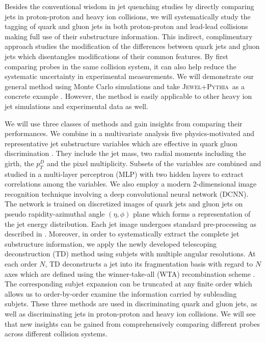 \documentclass[notoc]{JHEP3}
\newcommand{\jwpy}{\textsc{Jewel+Pythia}~}
\begin{document}
Besides the conventional wisdom in jet quenching studies by directly comparing jets in proton-proton and heavy ion collisions, we will systematically study the tagging of quark and gluon jets in both proton-proton and lead-lead collisions making full use of their substructure information. This indirect, complimentary approach studies the modification of the differences between quark jets and gluon jets which disentangles modifications of their common features. By first comparing probes in the same collision system, it can also help reduce the systematic uncertainty in experimental measurements. We will demonstrate our general method using Monte Carlo simulations and take \jwpy as a concrete example \cite{Zapp:2013zya,KunnawalkamElayavalli:2016ttl}. However, the method is easily applicable to other heavy ion jet simulations \cite{Armesto:2009fj,Cao:2017zih} and experimental data as well.

We will use three classes of methods and gain insights from comparing their performances. We combine in a multivariate analysis five physics-motivated and representative jet substructure variables which are effective in quark gluon discrimination \cite{Gallicchio:2012ez}. They include the jet mass, two radial moments including the girth, the $p_T^D$ and the pixel multiplicity. Subsets of the variables are combined and studied in a multi-layer perceptron (MLP) with two hidden layers to extract correlations among the variables. We also employ a modern 2-dimensional image recognition technique involving a deep convolutional neural network (DCNN). The network is trained on discretized images of quark jets and gluon jets on pseudo rapidity-azimuthal angle $(\eta,\phi)$ plane which forms a representation of the jet energy distribution. Each jet image undergoes standard pre-processing as described in \cite{deOliveira:2015xxd}. Moreover, in order to systematically extract the complete jet substructure information, we apply the newly developed telescoping deconstruction (TD) method using subjets with multiple angular resolutions. At each order $N$, TD deconstructs a jet into its fragmentation basis with regard to $N$ axes which are defined using the winner-take-all (WTA) recombination scheme \cite{Bertolini:2013iqa}. The corresponding subjet expansion can be truncated at any finite order which allows us to order-by-order examine the information carried by subleading subjets. These three methods are used in discriminating quark and gluon jets, as well as discriminating jets in proton-proton and heavy ion collisions. We will see that new insights can be gained from comprehensively comparing different probes across different collision systems.
\end{document}

